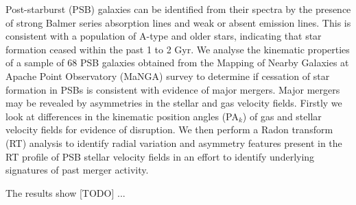 
Post-starburst (PSB) galaxies can be identified from their spectra by the presence of strong Balmer series absorption lines and weak or absent emission lines. This is consistent with a population of A-type and older stars, indicating that star formation ceased within the past 1 to 2 Gyr. We analyse the kinematic properties of a sample of 68 PSB galaxies obtained from the Mapping of Nearby Galaxies at Apache Point Observatory (MaNGA) survey to determine if cessation of star formation in PSBs is consistent with evidence of major mergers. Major mergers may be revealed by asymmetries in the stellar and gas velocity fields. Firstly we look at differences in the kinematic position angles (PA$_{k}$) of gas and stellar velocity fields for evidence of disruption. We then perform a Radon transform (RT) analysis to identify radial variation and asymmetry features present in the RT profile of PSB stellar velocity fields in an effort to identify underlying signatures of past merger activity.

The results show [TODO] ... 


